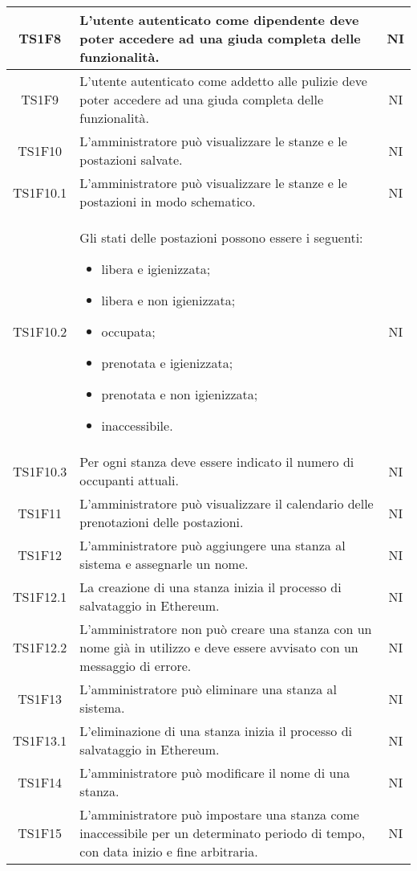 \begin{center}
\begin{longtable}{|c|p{10cm}|c|}
			TS1F8 & L'utente autenticato come dipendente deve poter accedere ad una giuda completa delle funzionalità. & NI \\			
			\hline
			TS1F9 & L'utente autenticato come addetto alle pulizie deve poter accedere ad una giuda completa delle funzionalità. & NI \\
			\hline
			TS1F10 & L'amministratore può visualizzare le stanze e le postazioni salvate. & NI \\			
			\hline
			TS1F10.1 & L'amministratore può visualizzare le stanze e le postazioni in modo schematico. & NI \\			
			\hline
			TS1F10.2 & Gli stati delle postazioni possono essere i seguenti:
			 \begin{itemize}
			 	\item libera e igienizzata;
			 	\item libera e non igienizzata;
			 	\item occupata;
			 	\item prenotata e igienizzata;
			 	\item prenotata e non igienizzata;
			 	\item inaccessibile.
			 \end{itemize}
			 & NI \\			
			\hline
			TS1F10.3 & Per ogni stanza deve essere indicato il numero di occupanti attuali. & NI \\			
			\hline
			TS1F11 & L'amministratore può visualizzare il calendario delle prenotazioni delle postazioni. & NI \\			
			\hline
			TS1F12 & L'amministratore può aggiungere una stanza al sistema e assegnarle un nome. & NI \\			
			\hline
			TS1F12.1 & La creazione di una stanza inizia il processo di salvataggio in Ethereum. & NI \\			
			\hline
			TS1F12.2 & L'amministratore non può creare una stanza con un nome già in utilizzo e deve essere avvisato con un messaggio di errore. & NI \\			
			\hline
			TS1F13 & L'amministratore può eliminare una stanza al sistema. & NI \\			
			\hline
			TS1F13.1 & L'eliminazione di una stanza inizia il processo di salvataggio in Ethereum. & NI \\			
			\hline
			TS1F14 & L'amministratore può modificare il nome di una stanza. & NI \\			
			\hline
			TS1F15 & L'amministratore può impostare una stanza come inaccessibile per un determinato periodo di tempo, con data inizio e fine arbitraria. & NI \\			

\end{longtable}
\end{center}
